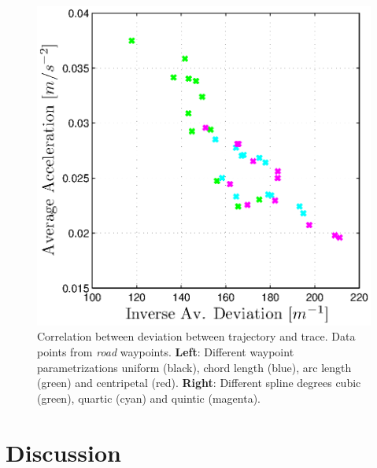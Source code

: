 \begin{figure}[H]
\begin{minipage}[t]{0.48\textwidth}
    \includegraphics[width = \textwidth]{correlation/Control_Correlation_InvDev_Acc_SplineDegree}
  \end{minipage}
  \caption{Correlation between deviation between trajectory and trace. Data points from \textit{road} waypoints. {\bf Left}: Different waypoint parametrizations uniform (black), chord length (blue), arc length (green) and centripetal (red). {\bf Right}: Different spline degrees cubic (green), quartic (cyan) and quintic (magenta).}
  \label{fig:correlation_invdev_acc}
\end{figure}

\pagebreak
\section{Discussion}
\label{sec:discussion}



